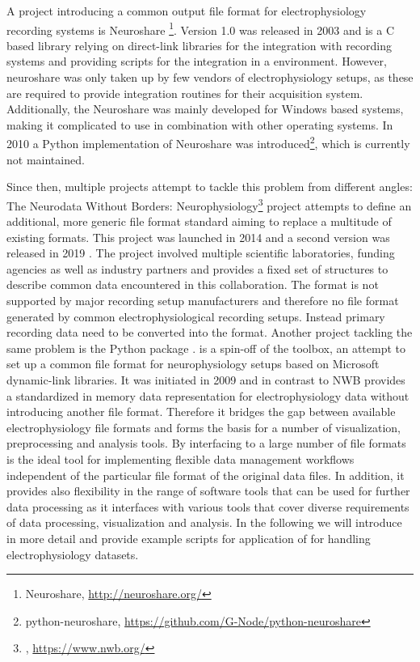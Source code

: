 A project introducing a common output file format for electrophysiology recording systems is Neuroshare \footnote{Neuroshare, \url{http://neuroshare.org/}}. Version 1.0 was released in 2003 and is a C based library relying on direct-link libraries for the integration with recording systems and providing scripts for the integration in a  environment. However, neuroshare was only taken up by few vendors of electrophysiology setups, as these are required to provide integration routines for their acquisition system. Additionally, the Neuroshare was mainly developed for Windows based systems, making it complicated to use in combination with other operating systems. In 2010 a Python implementation of Neuroshare was introduced\footnote{python-neuroshare, \url{https://github.com/G-Node/python-neuroshare}}, which is currently not maintained.

Since then, multiple projects attempt to tackle this problem from different angles: The Neurodata Without Borders: Neurophysiology\footnote{, \url{https://www.nwb.org/}} \citep{Teeters_2015} project attempts to define an additional, more generic file format standard aiming to replace a multitude of existing formats. This project was launched in 2014 and a second version was released in 2019 \citep{Rubel_2019}. The project involved multiple scientific laboratories, funding agencies as well as industry partners and provides a fixed set of structures to describe common data encountered in this collaboration. The  format is not supported by major recording setup manufacturers and therefore no file format generated by common electrophysiological recording setups. Instead primary recording data need to be converted into the  format.
Another project tackling the same problem is the Python package .  is a spin-off of the  toolbox, an attempt to set up a common file format for neurophysiology setups based on Microsoft dynamic-link libraries. It was initiated in 2009 and in contrast to NWB provides a standardized in memory data representation for electrophysiology data without introducing another file format. Therefore it bridges the gap between available electrophysiology file formats and forms the basis for a number of visualization, preprocessing and analysis tools. By interfacing to a large number of file formats  is the ideal tool for implementing flexible data management workflows independent of the particular file format of the original data files. In addition, it provides also flexibility in the range of software tools that can be used for further data processing as it interfaces with various tools that cover diverse requirements of data processing, visualization and analysis. In the following we will introduce  in more detail and provide example scripts for application of  for handling electrophysiology datasets.



